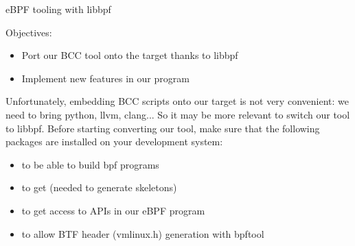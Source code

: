\subchapter
{eBPF tooling with libbpf}
{Objectives:
  \begin{itemize}
    \item Port our BCC tool onto the target thanks to libbpf
    \item Implement new features in our program
  \end{itemize}
}

Unfortunately, embedding BCC scripts onto our target is not very convenient: we need to bring python, llvm, clang... So it may be more relevant to switch our tool to libbpf. Before starting converting our tool, make sure that the following packages are installed on your development system:
\begin{itemize}
  \item {} to be able to build bpf programs
  \item {} to get  (needed to generate skeletons)
  \item {} to get access to  APIs in our eBPF program
  \item {} to allow BTF header (vmlinux.h) generation with bpftool
\end{itemize}

